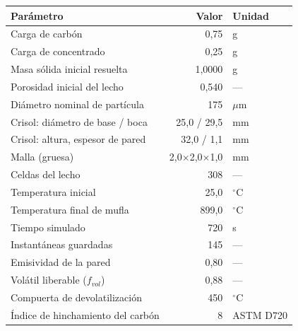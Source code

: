 \begin{tabular}{lrl}
    \hline
    Parámetro & Valor & Unidad \\
    \hline
    Carga de carbón & 0,75 & g \\
    Carga de concentrado & 0,25 & g \\
    Masa sólida inicial resuelta & 1,0000 & g \\
    Porosidad inicial del lecho & 0,540 & --- \\
    Diámetro nominal de partícula & 175 & $\mu$m \\
    Crisol: diámetro de base / boca & 25,0 / 29,5 & mm \\
    Crisol: altura, espesor de pared & 32,0 / 1,1 & mm \\
    Malla (gruesa) & 2,0$\times$2,0$\times$1,0 & mm \\
    Celdas del lecho & 308 & --- \\
    Temperatura inicial & 25,0 & $^\circ$C \\
    Temperatura final de mufla & 899,0 & $^\circ$C \\
    Tiempo simulado & 720 & s \\
    Instantáneas guardadas & 145 & --- \\
    Emisividad de la pared & 0,80 & --- \\
    Volátil liberable ($f_{vol}$) & 0,88 & --- \\
    Compuerta de devolatilización & 450 & $^\circ$C \\
    Índice de hinchamiento del carbón & 8 & ASTM D720 \\
    \hline
\end{tabular}
